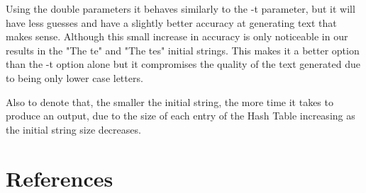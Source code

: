 \documentclass{article}
\begin{document}
Using the double parameters it behaves similarly to the -t parameter, but it will have less guesses and have a slightly better accuracy at generating text that makes sense.
Although this small increase in accuracy is only noticeable in our results in the "The te" and "The tes" initial strings.
This makes it a better option than the -t option alone but it compromises the quality of the text generated due to being only lower case letters.

Also to denote that, the smaller the initial string, the more time it takes to produce an output, due to the size of each entry of 
the Hash Table increasing as the initial string size decreases. 


\section{References}


\end{document}
